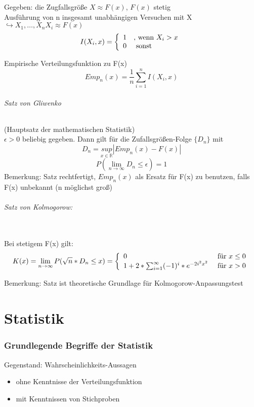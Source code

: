 \documentclass[a4paper,12pt]{scrartcl}
\begin{document}
 Gegeben: die Zugfallsgröße $X\approx F(x)$, $F(x)$ stetig\\
 Ausführung von n insgesamt unabhängigen Versuchen mit X\\
 $\hookrightarrow X_1,\dots,X_n$\quad$X_i\approx F(x)$
 $$I(X_i,x)=\left\{\begin{array}{l l}
                  1 & \text{, wenn }X_i>x\\
                  0 & \text{ sonst}
                 \end{array}\right.
 $$
 
 Empirische Verteilungsfunktion zu F(x)
 $$Emp_n(x) = \frac{1}{n}\sum_{i=1}^n I(X_i,x)$$
 \paragraph{Satz von Gliwenko} (Hauptsatz der mathematischen Statistik)\\
 $\epsilon > 0$ beliebig gegeben. Dann gilt für die Zufallsgrößen-Folge $\{D_n\}$ mit
 $$D_n = \underset{x\in\mathbb{R}}{sup}|Emp_n(x)-F(x)|$$
 $$P(\lim_{n\rightarrow\infty}D_n\leq\epsilon) = 1$$
 Bemerkung: Satz rechtfertigt, $Emp_n(x)$ als Ersatz für F(x) zu benutzen, falls F(x) unbekannt (n möglichst groß)\\
 \paragraph{Satz von Kolmogorow:}\quad\\
 Bei stetigem F(x) gilt:
 $$K(x) = \lim_{n\rightarrow\infty} P(\sqrt{n}*D_n\leq x) =
 \left\{\begin{array}{l l}
         0 & \text{ für } x\leq 0\\
         1+2*\sum_{i=1}^\infty(-1)^i*e^{-2i^2x^2} & \text{ für } x>0
        \end{array}\right.
$$

Bemerkung: Satz ist theoretische Grundlage für Kolmogorow-Anpassungstest
 
 \part{Statistik}
 \setcounter{section}{0}
 
\section{Grundlegende Begriffe der Statistik}

Gegenstand: Wahrscheinlichkeits-Aussagen
\begin{itemize}
 \item ohne Kenntnisse der Verteilungsfunktion
 \item mit Kenntnissen von Stichproben
\end{itemize}
\end{document}
